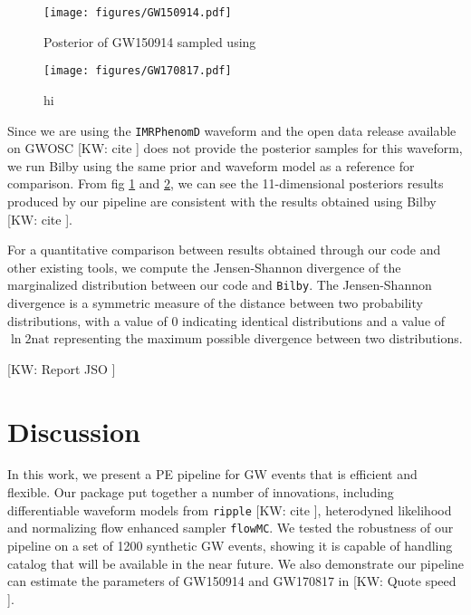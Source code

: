 \documentclass[twocolumn]{aastex631}
\newcommand{\kw}[1]{{\color{rb4}[KW: #1 ]}}
\begin{document}
\begin{figure}
    \texttt{[image: figures/GW150914.pdf]}
    \caption{
        Posterior of GW150914 sampled using 
    }
    \label{fig:GW150914}
\end{figure}

\begin{figure}
\texttt{[image: figures/GW170817.pdf]}
\caption{
    hi
}
\label{fig:GW170817}
\end{figure}

Since we are using the \texttt{IMRPhenomD} waveform and the open data release
available on GWOSC \kw{cite} does not provide the posterior samples for this
waveform, we run Bilby using the same prior and waveform model as a reference
for comparison. From fig \ref{fig:GW150914} and \ref{fig:GW170817}, we can see
the 11-dimensional posteriors results produced by our pipeline are consistent
with the results obtained using Bilby \kw{cite}.


For a quantitative comparison between results obtained through our code and
other existing tools, we compute the Jensen-Shannon divergence of the
marginalized distribution between our code and \texttt{Bilby}. The
Jensen-Shannon divergence is a symmetric measure of the distance between two
probability distributions, with a value of 0 indicating identical distributions
and a value of $\ln{2} \textrm{nat}$ representing the maximum possible
divergence between two distributions.

\kw{Report JSO} 

\section{Discussion}
\label{sec: Discussion}

In this work, we present a PE pipeline for GW events that is efficient and
flexible. Our package put together a number of innovations, including
differentiable waveform models from \texttt{ripple} \kw{cite}, heterodyned
likelihood and normalizing flow enhanced sampler \texttt{flowMC}. We tested the
robustness of our pipeline on a set of 1200 synthetic GW events, showing it is
capable of handling catalog that will be available in the near future. We also
demonstrate our pipeline can estimate the parameters of GW150914 and GW170817 in
\kw{Quote speed}. 
\end{document}
